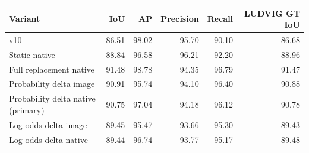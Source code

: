 \begin{tabular}{lrrrrr}
\toprule
Variant & IoU & AP & Precision & Recall & LUDVIG GT IoU \\\midrule
v10 & 86.51 & 98.02 & 95.70 & 90.10 & 86.68 \\
Static native & 88.84 & 96.58 & 96.21 & 92.20 & 88.96 \\
Full replacement native & 91.48 & 98.78 & 94.35 & 96.79 & 91.47 \\
Probability delta image & 90.91 & 95.74 & 94.10 & 96.40 & 90.88 \\
Probability delta native (primary) & 90.75 & 97.04 & 94.18 & 96.12 & 90.78 \\
Log-odds delta image & 89.45 & 95.47 & 93.66 & 95.30 & 89.43 \\
Log-odds delta native & 89.44 & 96.74 & 93.77 & 95.17 & 89.48 \\
\bottomrule
\end{tabular}
